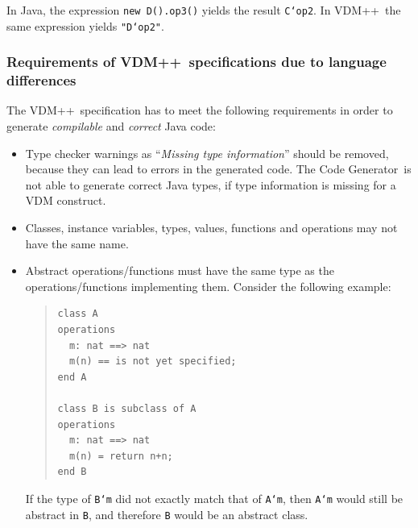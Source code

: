 \documentclass[\pformat,11pt]{article}
\newcommand{\Tcg}{The Code Generator}
\newcommand{\VDM}{VDM++}
\begin{document}
In Java, the expression \texttt{new D().op3()} yields the result
\texttt{C`op2}. In \VDM\ the same expression yields \texttt{"D`op2"}. 

\subsubsection{Requirements of \VDM\ specifications due to language differences}
\label{lim1}

The \VDM\ specification has to meet the following requirements in
order to generate {\em compilable} and {\em correct} Java code:

\begin{itemize}
\item Type checker warnings as ``{\em Missing type information}'' should
  be removed, because they can lead to errors in the generated code.
  \Tcg\ is not able to generate correct Java types, if type information is
  missing for a VDM construct.

\item Classes, instance variables, types, values, functions and operations may not have the same name.
%

\item Abstract operations/functions must have the same type as the
operations/functions implementing them. Consider the following example: 
\begin{quote}
\begin{small}
\begin{verbatim}
class A
operations
  m: nat ==> nat
  m(n) == is not yet specified;
end A

class B is subclass of A
operations
  m: nat ==> nat
  m(n) = return n+n;
end B
\end{verbatim}
\end{small}
\end{quote}
If the type of \texttt{B`m} did not exactly match that of
\texttt{A`m}, then \texttt{A`m} would still be abstract in \texttt{B},
and therefore \texttt{B} would be an abstract class.


\end{itemize}
\end{document}
